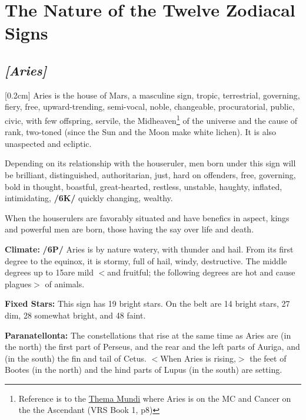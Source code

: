 
\section{The Nature of the Twelve Zodiacal Signs}
\subsection{\textit{[Aries]}}
[0.2cm]
Aries is the house of Mars, a masculine sign, tropic, terrestrial, governing, fiery, free, upward-trending,
semi-vocal, noble, changeable, procuratorial, public, civic, with few offspring, servile, the Midheaven\footnote{Reference is to the \href{http://planetwavesweekly.com/dadatemp/1832374392.html}{Thema Mundi} where Aries is on the MC and Cancer on the the Ascendant (VRS Book 1, p8)} of the universe and the cause of rank, two-toned (since the Sun and the Moon make white lichen). It is also unaspected and ecliptic. 

\mndl[0.2cm]
Depending on its relationship with the houseruler, men born under this sign will be brilliant, distinguished, authoritarian, just, hard on offenders, free, governing, bold in thought, boastful, great-hearted, restless, unstable, haughty, inflated, intimidating, \textbf{/6K/} quickly changing, wealthy. 

\mndl[0.2cm]
When the houserulers are favorably situated and have benefics in aspect, kings and powerful men are born, those
having the say over life and death.

\textbf{Climate:} \textbf{/6P/} Aries is by nature watery, with thunder and hail. From its first degree to the equinox, it is stormy, full of hail, windy, destructive. The middle degrees up to 15\deg are mild $<$and fruitful; the following degrees are hot and cause plagues$>$ of animals. 

\textbf{Fixed Stars:} This sign has 19 bright stars. On the belt are 14 bright stars, 27 dim, 28 somewhat bright, and 48 faint. 

\textbf{Paranatellonta:} The constellations that rise at the same time as Aries are (in the north) the first part of Perseus, and the rear and the left parts of Auriga, and (in the south) the fin and
tail of Cetus. $<$When Aries is rising,$>$ the feet of Bootes (in the north) and the hind parts of Lupus (in the south) are setting.

